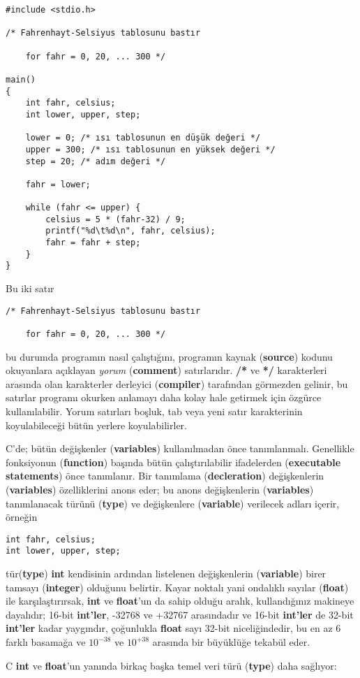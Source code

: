\documentclass[a4paper,12pt,oneside]{book}
\begin{document}
\begin{lstlisting}
#include <stdio.h>

/* Fahrenhayt-Selsiyus tablosunu bastır

    for fahr = 0, 20, ... 300 */

main()
{
    int fahr, celsius;
    int lower, upper, step;

    lower = 0; /* ısı tablosunun en düşük değeri */
    upper = 300; /* ısı tablosunun en yüksek değeri */
    step = 20; /* adım değeri */

    fahr = lower;

    while (fahr <= upper) {
        celsius = 5 * (fahr-32) / 9;
        printf("%d\t%d\n", fahr, celsius);
        fahr = fahr + step;
    }
}
\end{lstlisting}
Bu iki satır \begin{lstlisting}
/* Fahrenhayt-Selsiyus tablosunu bastır

    for fahr = 0, 20, ... 300 */
\end{lstlisting}
bu durumda programın nasıl çalıştığını, programın kaynak (\textbf{source}) kodunu okuyanlara açıklayan \textit{yorum} (\textbf{comment}) satırlarıdır. \textbf{/*} ve \textbf{*/} karakterleri arasında olan karakterler derleyici (\textbf{compiler}) tarafından görmezden gelinir, bu satırlar programı okurken anlamayı daha kolay hale getirmek için özgürce kullanılabilir. Yorum satırları boşluk, tab veya yeni satır karakterinin koyulabileceği bütün yerlere koyulabilirler.
\par C'de; bütün değişkenler (\textbf{variables}) kullanılmadan önce tanımlanmalı. Genellikle fonksiyonun (\textbf{function}) başında bütün çalıştırılabilir ifadelerden (\textbf{executable statements}) önce tanımlanır. Bir tanımlama (\textbf{decleration}) değişkenlerin (\textbf{variables}) özelliklerini anons eder; bu anons değişkenlerin (\textbf{variables}) tanımlanacak türünü (\textbf{type}) ve değişkenlere (\textbf{variable}) verilecek adları içerir, örneğin
\newline
\begin{lstlisting}
int fahr, celsius;
int lower, upper, step;
\end{lstlisting}
tür(\textbf{type}) \textbf{int} kendisinin ardından listelenen değişkenlerin (\textbf{variable}) birer tamsayı (\textbf{integer}) olduğunu belirtir. Kayar noktalı yani ondalıklı sayılar (\textbf{float}) ile karşılaştırırsak, \textbf{int} ve \textbf{float}'un da sahip olduğu aralık, kullandığınız makineye dayalıdır; 16-bit \textbf{int'ler}, -32768 ve +32767 arasındadır ve 16-bit \textbf{int'ler} de 32-bit \textbf{int'ler} kadar yaygındır, çoğunlukla \textbf{float} sayı 32-bit niceliğindedir, bu en az 6 farklı basamağa ve $10^{-38}$ ve $10^{+38}$ arasında bir büyüklüğe tekabül eder.
\par C \textbf{int} ve \textbf{float}'un yanında birkaç başka temel veri türü (\textbf{type}) daha sağlıyor:
\end{document}
